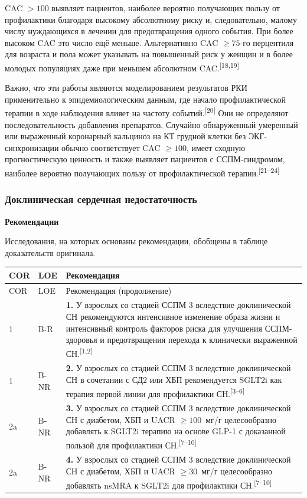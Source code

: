 \documentclass[11pt,a4paper]{article}
\newcommand{\src}[1]{\textsuperscript{[#1]}}
\newcommand{\heading}[1]{\par\medskip\textbf{#1}\par}
\begin{document}
CAC $>100$ выявляет пациентов, наиболее вероятно получающих пользу от профилактики благодаря высокому абсолютному риску и, следовательно, малому числу нуждающихся в лечении для предотвращения одного события. При более высоком CAC это число ещё меньше. Альтернативно CAC $\geq75$-го перцентиля для возраста и пола может указывать на повышенный риск у женщин и в более молодых популяциях даже при меньшем абсолютном CAC.\src{18,19}

Важно, что эти работы являются моделированием результатов РКИ применительно к эпидемиологическим данным, где начало профилактической терапии в ходе наблюдения влияет на частоту событий.\src{20} Они не определяют последовательность добавления препаратов. Случайно обнаруженный умеренный или выраженный коронарный кальциноз на КТ грудной клетки без ЭКГ-синхронизации обычно соответствует CAC $\geq100$, имеет сходную прогностическую ценность и также выявляет пациентов с ССПМ-синдромом, наиболее вероятно получающих пользу от профилактической терапии.\src{21--24}

\subsubsection{Доклиническая сердечная недостаточность}
\heading{Рекомендации}
Исследования, на которых основаны рекомендации, обобщены в таблице доказательств оригинала.

{\small
\begin{longtable}{P{0.07\textwidth}P{0.11\textwidth}P{0.75\textwidth}}
\toprule COR & LOE & Рекомендация\\\midrule
\endfirsthead
\toprule COR & LOE & Рекомендация (продолжение)\\\midrule
{} & B-R & \textbf{1.} У взрослых со стадией ССПМ 3 вследствие доклинической СН рекомендуются интенсивное изменение образа жизни и интенсивный контроль факторов риска для улучшения ССПМ-здоровья и предотвращения перехода к клинически выраженной СН.\src{1,2}\\[5pt]
1 & B-NR & \textbf{2.} У взрослых со стадией ССПМ 3 вследствие доклинической СН в сочетании с СД2 или ХБП рекомендуется SGLT2i как терапия первой линии для профилактики СН.\src{3--6}\\[5pt]
2a & B-NR & \textbf{3.} У взрослых со стадией ССПМ 3 вследствие доклинической СН с диабетом, ХБП и UACR $\geq100$~мг/г целесообразно добавлять к SGLT2i терапию на основе GLP-1 с доказанной пользой для профилактики СН.\src{7--10}\\[5pt]
2a & B-NR & \textbf{4.} У взрослых со стадией ССПМ 3 вследствие доклинической СН с диабетом, ХБП и UACR $\geq30$~мг/г целесообразно добавлять nsMRA к SGLT2i для профилактики СН.\src{7--10}\\
\bottomrule
\end{longtable}
}
\end{document}

